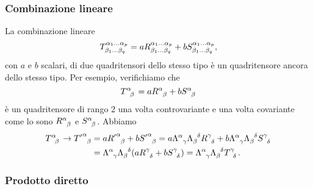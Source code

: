 \subsubsection{Combinazione lineare}
\label{sec:combinazione-lineare}

La combinazione lineare
\begin{equation}
  \tensor*{T}{^{\alpha_{1}\dots\alpha_{p}}_{\beta_{1}\dots\beta_{q}}} = a
  \tensor*{R}{^{\alpha_{1}\dots\alpha_{p}}_{\beta_{1}\dots\beta_{q}}} + b
  \tensor*{S}{^{\alpha_{1}\dots\alpha_{p}}_{\beta_{1}\dots\beta_{q}}},
\end{equation}
con $a$ e $b$ scalari, di due quadritensori dello stesso tipo è un quadritensore
ancora dello stesso tipo.  Per esempio, verifichiamo che
\begin{equation}
  \tensor{T}{^{\alpha}_{\beta}} = a \tensor{R}{^{\alpha}_{\beta}} + b
  \tensor{S}{^{\alpha}_{\beta}}
\end{equation}
è un quadritensore di rango $2$ una volta controvariante e una volta covariante
come lo sono $\tensor{R}{^{\alpha}_{\beta}}$ e
$\tensor{S}{^{\alpha}_{\beta}}$. Abbiamo
\begin{equation}
  \begin{split}
    \tensor{T}{^{\alpha}_{\beta}} \to \tensor{{T'}}{^{\alpha}_{\beta}} &= a
    \tensor{{R'}}{^{\alpha}_{\beta}} + b \tensor{{S'}}{^{\alpha}_{\beta}} = a
    \tensor{\Lambda}{^{\alpha}_{\gamma}} \tensor{\Lambda}{_{\beta}^{\delta}}
    \tensor{R}{^{\gamma}_{\delta}} + b \tensor{\Lambda}{^{\alpha}_{\gamma}}
    \tensor{\Lambda}{_{\beta}^{\delta}} \tensor{S}{^{\gamma}_{\delta}} \\
    &= \tensor{\Lambda}{^{\alpha}_{\gamma}}
    \tensor{\Lambda}{_{\beta}^{\delta}}(a \tensor{R}{^{\gamma}_{\delta}} + b
    \tensor{S}{^{\gamma}_{\delta}}) = \tensor{\Lambda}{^{\alpha}_{\gamma}}
    \tensor{\Lambda}{_{\beta}^{\delta}} \tensor{T}{^{\gamma}_{\delta}}.
  \end{split}
\end{equation}

\subsubsection{Prodotto diretto}
\label{sec:prodotto-diretto}

